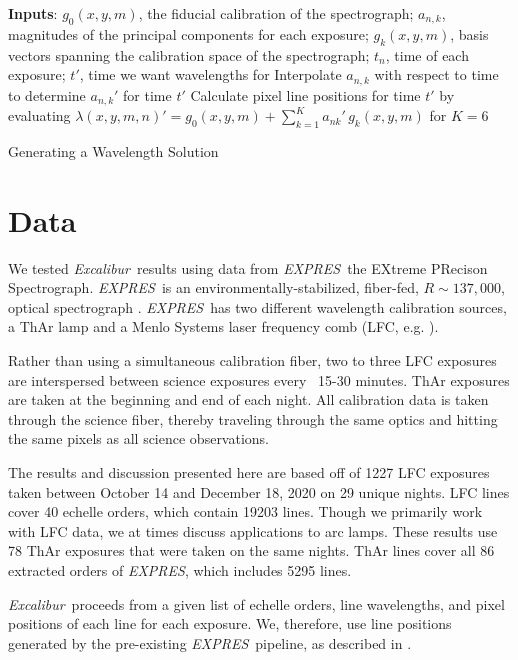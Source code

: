 \documentclass[twocolumn]{aastex63}
\newcommand{\project}[1]{\textsl{#1}}
\newcommand{\name}{\project{Excalibur}}
\newcommand{\acronym}[1]{{\small{#1}}}
\newcommand{\expres}{\project{\acronym{EXPRES}}}
\begin{document}
\begin{algorithm}
\SetAlgoLined
\textbf{Inputs}: $g_0(x,y,m)$, the fiducial calibration of the spectrograph; $a_{n,k}$, magnitudes of the principal components for each exposure; $g_k(x,y,m)$, basis vectors spanning the calibration space of the spectrograph; $t_n$, time of each exposure; $t'$, time we want wavelengths for\;
Interpolate $a_{n,k}$ with respect to time to determine $a_{n,k}'$ for time $t'$\;
Calculate pixel line positions for time $t'$ by evaluating\;
$\lambda(x,y,m,n)' = g_0(x,y,m) + \sum_{k=1}^K a_{nk}'\,g_k(x,y,m)$ for $K=6$\;
\caption{Generating a Wavelength Solution}
\end{algorithm}


\section{Data} \label{sec:data}
We tested \name\ results using data from \expres\, the EXtreme PRecison Spectrograph.  \expres\ is an environmentally-stabilized, fiber-fed, $R\sim137,000$, optical spectrograph \citep{jurgenson2016, blackman2020}.  \expres\ has two different wavelength calibration sources, a ThAr lamp and a Menlo Systems laser frequency comb (LFC, e.g. \cite{wilken2012, molaro2013, probst2014}).

Rather than using a simultaneous calibration fiber, two to three LFC exposures are interspersed between science exposures every ~15-30 minutes.  ThAr exposures are taken at the beginning and end of each night.  All calibration data is taken through the science fiber, thereby traveling through the same optics and hitting the same pixels as all science observations.

The results and discussion presented here are based off of 1227 LFC exposures taken between October 14 and December 18, 2020 on 29 unique nights.  LFC lines cover 40 echelle orders, which contain 19203 lines.  Though we primarily work with LFC data, we at times discuss applications to arc lamps.  These results use 78 ThAr exposures that were taken on the same nights.  ThAr lines cover all 86 extracted orders of \expres, which includes 5295 lines.

 \name\ proceeds from a given list of echelle orders, line wavelengths, and pixel positions of each line for each exposure.  We, therefore, use line positions generated by the pre-existing \expres\ pipeline, as described in \cite{petersburg2020}.
 
\end{document}
